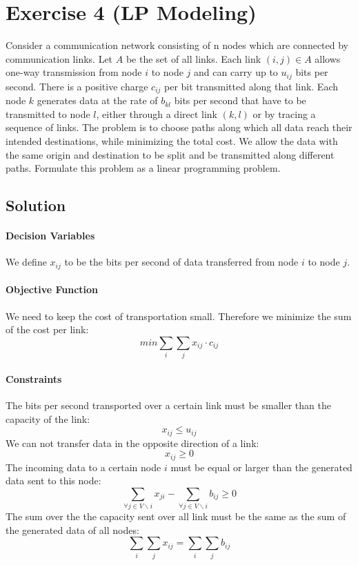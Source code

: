 \documentclass[a4paper, 12pt]{report}
\begin{document}
\section{Exercise 4 (LP Modeling)}

Consider a communication network consisting of n nodes which are connected by
communication links. Let $A$ be the set of all links. Each link $(i,j) ∈ A$
allows one-way transmission from node $i$ to node $j$ and can carry up to
$u_{ij}$ bits per second. There is a positive charge $c_{ij}$ per bit
transmitted along that link. Each node $k$ generates data at the rate of
$b_{kl}$ bits per second that have to be transmitted to node $l$, either
through a direct link $(k,l)$ or by tracing a sequence of links. The problem is
to choose paths along which all data reach their intended destinations, while
minimizing the total cost. We allow the data with the same origin and
destination to be split and be transmitted along different paths. Formulate
this problem as a linear programming problem.

\subsection{Solution}

\paragraph{Decision Variables} We define $x_{ij}$ to be the bits per second of
data transferred from node $i$ to node $j$.

\paragraph{Objective Function} We need to keep the cost of transportation
small. Therefore we minimize the sum of the cost per link:
\[
    min ∑_{i}∑_{j} x_{ij} · c_{ij}
\]

\paragraph{Constraints} The bits per second transported over a certain link
must be smaller than the capacity of the link:
\[
    x_{ij} ≤ u_{ij}
\]
We can not transfer data in the opposite direction of a link:
\[
    x_{ij} ≥ 0
\]
The incoming data to a certain node $i$ must be equal or larger than the
generated data sent to this node:
\[
    ∑_{∀j ∈ V∖i} x_{ji} - ∑_{∀j ∈ V∖i} b_{ij} ≥ 0
\]
The sum over the the capacity sent over all link must be the same as the sum of
the generated data of all nodes:
\[
    ∑_{i}∑_{j}x_{ij} = ∑_{i}∑_{j}b_{ij}
\]
\end{document}
